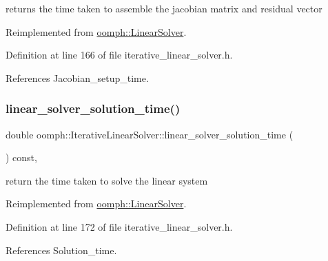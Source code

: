 returns the time taken to assemble the jacobian matrix and residual vector 



Reimplemented from \hyperlink{classoomph_1_1LinearSolver_a0fedfb9d9855d0e998c0e32140bc56d4}{oomph\+::\+Linear\+Solver}.



Definition at line 166 of file iterative\+\_\+linear\+\_\+solver.\+h.



References Jacobian\+\_\+setup\+\_\+time.

\mbox{\label{classoomph_1_1IterativeLinearSolver_a65544b6c2090d3d019f48e047e338352}} 
\subsubsection{\texorpdfstring{linear\+\_\+solver\+\_\+solution\+\_\+time()}{linear\_solver\_solution\_time()}}
{\footnotesize\ttfamily double oomph\+::\+Iterative\+Linear\+Solver\+::linear\+\_\+solver\+\_\+solution\+\_\+time (\begin{DoxyParamCaption}{ }\end{DoxyParamCaption}) const\hspace{0.3cm}{\ttfamily [inline]}, {\ttfamily [virtual]}}



return the time taken to solve the linear system 



Reimplemented from \hyperlink{classoomph_1_1LinearSolver_a3c66f77db812a9c196478c7e2f77ef09}{oomph\+::\+Linear\+Solver}.



Definition at line 172 of file iterative\+\_\+linear\+\_\+solver.\+h.



References Solution\+\_\+time.

\mbox{\label{classoomph_1_1IterativeLinearSolver_adecee5890003a9178366799cb22b63e0}} 
